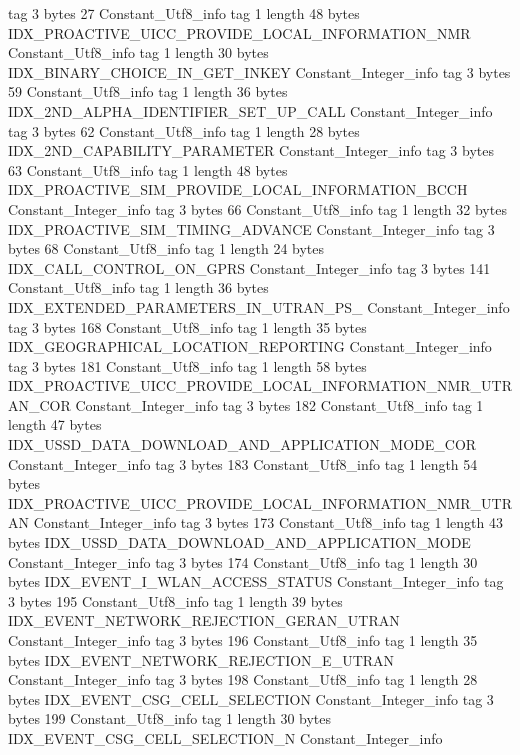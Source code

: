 {{{			tag	3
			bytes	27
		}
		Constant_Utf8_info {
			tag	1
			length	48
			bytes	IDX_PROACTIVE_UICC_PROVIDE_LOCAL_INFORMATION_NMR
		}
		Constant_Utf8_info {
			tag	1
			length	30
			bytes	IDX_BINARY_CHOICE_IN_GET_INKEY
		}
		Constant_Integer_info {
			tag	3
			bytes	59
		}
		Constant_Utf8_info {
			tag	1
			length	36
			bytes	IDX_2ND_ALPHA_IDENTIFIER_SET_UP_CALL
		}
		Constant_Integer_info {
			tag	3
			bytes	62
		}
		Constant_Utf8_info {
			tag	1
			length	28
			bytes	IDX_2ND_CAPABILITY_PARAMETER
		}
		Constant_Integer_info {
			tag	3
			bytes	63
		}
		Constant_Utf8_info {
			tag	1
			length	48
			bytes	IDX_PROACTIVE_SIM_PROVIDE_LOCAL_INFORMATION_BCCH
		}
		Constant_Integer_info {
			tag	3
			bytes	66
		}
		Constant_Utf8_info {
			tag	1
			length	32
			bytes	IDX_PROACTIVE_SIM_TIMING_ADVANCE
		}
		Constant_Integer_info {
			tag	3
			bytes	68
		}
		Constant_Utf8_info {
			tag	1
			length	24
			bytes	IDX_CALL_CONTROL_ON_GPRS
		}
		Constant_Integer_info {
			tag	3
			bytes	141
		}
		Constant_Utf8_info {
			tag	1
			length	36
			bytes	IDX_EXTENDED_PARAMETERS_IN_UTRAN_PS_
		}
		Constant_Integer_info {
			tag	3
			bytes	168
		}
		Constant_Utf8_info {
			tag	1
			length	35
			bytes	IDX_GEOGRAPHICAL_LOCATION_REPORTING
		}
		Constant_Integer_info {
			tag	3
			bytes	181
		}
		Constant_Utf8_info {
			tag	1
			length	58
			bytes	IDX_PROACTIVE_UICC_PROVIDE_LOCAL_INFORMATION_NMR_UTRAN_COR
		}
		Constant_Integer_info {
			tag	3
			bytes	182
		}
		Constant_Utf8_info {
			tag	1
			length	47
			bytes	IDX_USSD_DATA_DOWNLOAD_AND_APPLICATION_MODE_COR
		}
		Constant_Integer_info {
			tag	3
			bytes	183
		}
		Constant_Utf8_info {
			tag	1
			length	54
			bytes	IDX_PROACTIVE_UICC_PROVIDE_LOCAL_INFORMATION_NMR_UTRAN
		}
		Constant_Integer_info {
			tag	3
			bytes	173
		}
		Constant_Utf8_info {
			tag	1
			length	43
			bytes	IDX_USSD_DATA_DOWNLOAD_AND_APPLICATION_MODE
		}
		Constant_Integer_info {
			tag	3
			bytes	174
		}
		Constant_Utf8_info {
			tag	1
			length	30
			bytes	IDX_EVENT_I_WLAN_ACCESS_STATUS
		}
		Constant_Integer_info {
			tag	3
			bytes	195
		}
		Constant_Utf8_info {
			tag	1
			length	39
			bytes	IDX_EVENT_NETWORK_REJECTION_GERAN_UTRAN
		}
		Constant_Integer_info {
			tag	3
			bytes	196
		}
		Constant_Utf8_info {
			tag	1
			length	35
			bytes	IDX_EVENT_NETWORK_REJECTION_E_UTRAN
		}
		Constant_Integer_info {
			tag	3
			bytes	198
		}
		Constant_Utf8_info {
			tag	1
			length	28
			bytes	IDX_EVENT_CSG_CELL_SELECTION
		}
		Constant_Integer_info {
			tag	3
			bytes	199
		}
		Constant_Utf8_info {
			tag	1
			length	30
			bytes	IDX_EVENT_CSG_CELL_SELECTION_N
		}
		Constant_Integer_info {
}}}
